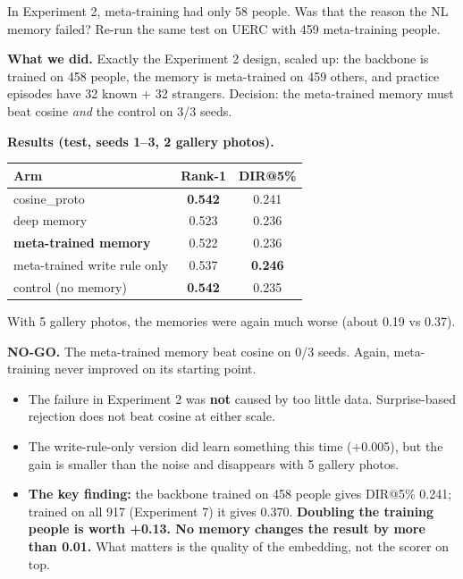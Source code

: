 \documentclass[11pt,a4paper]{article}
\begin{document}
\begin{question}
In Experiment 2, meta-training had only 58 people. Was that the reason the NL memory failed? Re-run the same test on UERC with 459 meta-training people.
\end{question}

\textbf{What we did.} Exactly the Experiment 2 design, scaled up: the backbone is trained on 458 people, the memory is meta-trained on 459 others, and practice episodes have 32 known + 32 strangers. Decision: the meta-trained memory must beat cosine \emph{and} the control on 3/3 seeds.

\textbf{Results (test, seeds 1--3, 2 gallery photos).}
\begin{center}
\begin{tabular}{@{}lcc@{}}
\toprule
\textbf{Arm} & \textbf{Rank-1} & \textbf{DIR@5\%}\\
\midrule
cosine\_proto & \textbf{0.542} & 0.241\\
deep memory & 0.523 & 0.236\\
\textbf{meta-trained memory} & 0.522 & 0.236\\
meta-trained write rule only & 0.537 & \textbf{0.246}\\
control (no memory) & \textbf{0.542} & 0.235\\
\bottomrule
\end{tabular}
\end{center}
With 5 gallery photos, the memories were again much worse (about 0.19 vs 0.37).

\begin{verdict}
\textbf{NO-GO.} The meta-trained memory beat cosine on 0/3 seeds. Again, meta-training never improved on its starting point.
\end{verdict}

\begin{means}
\begin{itemize}[leftmargin=1.2em]
  \item The failure in Experiment 2 was \textbf{not} caused by too little data. Surprise-based rejection does not beat cosine at either scale.
  \item The write-rule-only version did learn something this time (+0.005), but the gain is smaller than the noise and disappears with 5 gallery photos.
  \item \textbf{The key finding:} the backbone trained on 458 people gives DIR@5\% 0.241; trained on all 917 (Experiment 7) it gives 0.370. \textbf{Doubling the training people is worth +0.13. No memory changes the result by more than 0.01.} What matters is the quality of the embedding, not the scorer on top.
\end{itemize}
\end{means}
\end{document}
